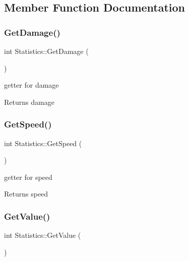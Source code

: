 \subsection{Member Function Documentation}
\mbox{\label{class_statistics_a46693e6826f75d2b1b40c1ea34707096}} 
\subsubsection{\texorpdfstring{Get\+Damage()}{GetDamage()}}
{\footnotesize\ttfamily int Statistics\+::\+Get\+Damage (\begin{DoxyParamCaption}{ }\end{DoxyParamCaption})}



getter for damage 

\begin{DoxyReturn}{Returns}
damage 
\end{DoxyReturn}
\mbox{\label{class_statistics_a055c86f402070457d85468dc9c8e0b5a}} 
\subsubsection{\texorpdfstring{Get\+Speed()}{GetSpeed()}}
{\footnotesize\ttfamily int Statistics\+::\+Get\+Speed (\begin{DoxyParamCaption}{ }\end{DoxyParamCaption})}



getter for speed 

\begin{DoxyReturn}{Returns}
speed 
\end{DoxyReturn}
\mbox{\label{class_statistics_a5f6ba53f54849e07de0e30ae7b07e818}} 
\subsubsection{\texorpdfstring{Get\+Value()}{GetValue()}}
{\footnotesize\ttfamily int Statistics\+::\+Get\+Value (\begin{DoxyParamCaption}{ }\end{DoxyParamCaption})}



